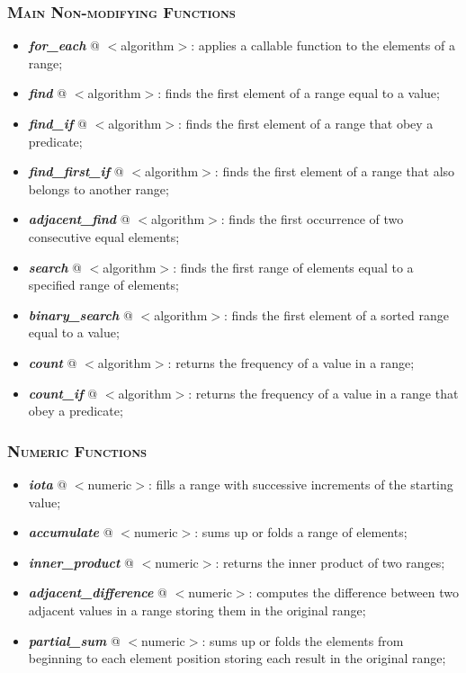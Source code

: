 \documentclass[10pt]{article}
\begin{document}
\begin{multicols*}{5}
{{\subsubsection*{\textsc{Main Non-modifying Functions}} 
\begin{itemize}[leftmargin=*,topsep=0.25pt]
  \setlength\itemsep{-1.8pt}
	\item  \emph{\textbf{for\_each}} @ $<$algorithm$>$: applies a callable function to the elements of a range;
	\item  \emph{\textbf{find}} @ $<$algorithm$>$: finds the first element of a range equal to a value; 
	\item  \emph{\textbf{find\_if}} @ $<$algorithm$>$: finds the first element of a range that obey a predicate;
	\item  \emph{\textbf{find\_first\_if}} @ $<$algorithm$>$: finds the first element of a range that also belongs to another range;  
	\item  \emph{\textbf{adjacent\_find}} @ $<$algorithm$>$: finds the first occurrence of two consecutive equal elements;
	\item  \emph{\textbf{search}} @ $<$algorithm$>$: finds the first range of elements equal to a specified range of elements;  
	\item  \emph{\textbf{binary\_search}} @ $<$algorithm$>$: finds the first element of a sorted range equal to a value;  
	\item  \emph{\textbf{count}} @ $<$algorithm$>$: returns the frequency of a value in a range; 
	\item  \emph{\textbf{count\_if}} @ $<$algorithm$>$: returns the frequency of a value in a range that obey a predicate;
\end{itemize}

\subsubsection*{\textsc{Numeric Functions}} 
\begin{itemize}[leftmargin=*,topsep=0.25pt]
  \setlength\itemsep{-1.8pt}
	\item  \emph{\textbf{iota}} @ $<$numeric$>$: fills a range with successive increments of the starting value;
	\item  \emph{\textbf{accumulate}} @ $<$numeric$>$: sums up or folds a range of elements;
	\item  \emph{\textbf{inner\_product}} @ $<$numeric$>$: returns the inner product of two ranges;
	\item  \emph{\textbf{adjacent\_difference}} @ $<$numeric$>$: computes the difference between two adjacent values in a range storing them in the original range;
	\item  \emph{\textbf{partial\_sum}} @ $<$numeric$>$: sums up or folds the elements from beginning to each element position storing each result in the original range;
\end{itemize}


}

}
\end{multicols*}
\end{document}
